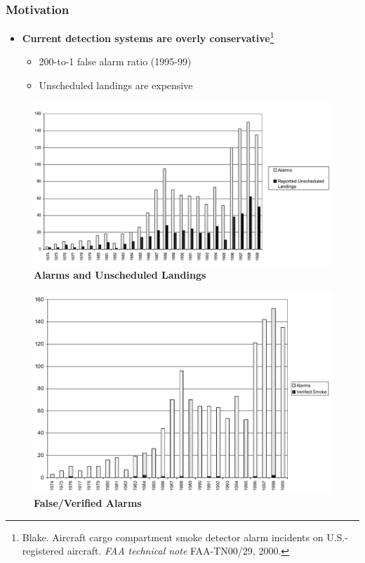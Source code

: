 \documentclass[9pt]{beamer}
\begin{document}
\begin{frame}
\frametitle{Motivation}
\label{sec-4-2}

\begin{itemize}
\item \textbf{Current detection systems are overly conservative}\footnote{Blake. Aircraft cargo compartment smoke detector alarm incidents on U.S.-registered aircraft. \emph{FAA technical note} FAA-TN00/29, 2000.
 }
\begin{itemize}
\item 200-to-1 false alarm ratio (1995-99)
\item Unscheduled landings are expensive
\end{itemize}
\end{itemize}
\centering
\begin{minipage}[b]{0.45\linewidth}
\begin{figure}
\includegraphics[width=0.9\linewidth]{alarmlandings.png} \\
\textbf{Alarms and Unscheduled Landings}
\end{figure}
\end{minipage}
\begin{minipage}[b]{0.45\linewidth}
\begin{figure}
\includegraphics[width=0.9\linewidth]{alarms_vs_verified.png} \\
\textbf{False/Verified Alarms}
\end{figure}
\end{minipage}
\end{frame}
\end{document}
